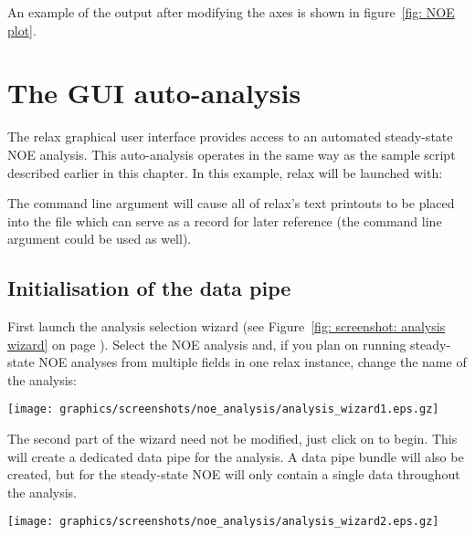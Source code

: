 An example of the output after modifying the axes is shown in figure~\ref{fig: NOE plot}.



\newpage
\section{The GUI auto-analysis}

The relax graphical user interface provides access to an automated steady-state NOE analysis.  This auto-analysis operates in the same way as the sample script described earlier in this chapter.  In this example, relax will be launched with:


The  command line argument will cause all of relax's text printouts to be placed into the  file which can serve as a record for later reference (the  command line argument could be used as well).



\subsection{Initialisation of the data pipe}

First launch the analysis selection wizard (see Figure~\ref{fig: screenshot: analysis wizard} on page \pageref{fig: screenshot: analysis wizard}).  Select the NOE analysis and, if you plan on running steady-state NOE analyses from multiple fields in one relax instance, change the name of the analysis:

\begin{minipage}[h]{\linewidth}
\centerline{\texttt{[image: graphics/screenshots/noe\_analysis/analysis\_wizard1.eps.gz]}}
\end{minipage}

The second part of the wizard need not be modified, just click on  to begin.  This will create a dedicated data pipe for the analysis.  A data pipe bundle will also be created, but for the steady-state NOE will only contain a single data throughout the analysis.

\begin{minipage}[h]{\linewidth}
\centerline{\texttt{[image: graphics/screenshots/noe\_analysis/analysis\_wizard2.eps.gz]}}
\end{minipage}


